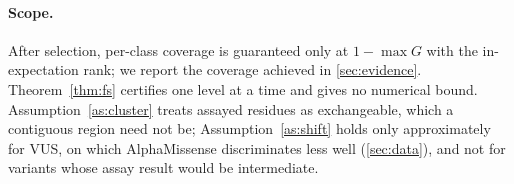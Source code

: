 \paragraph{Scope.}
After selection, per-class coverage is guaranteed only at $1-\max G$ with the in-expectation rank; we report the coverage
achieved in \cref{sec:evidence}. Theorem~\ref{thm:fs} certifies one level at a time and gives no numerical bound.
Assumption~\ref{as:cluster} treats assayed residues as exchangeable, which a contiguous region need not be;
Assumption~\ref{as:shift} holds only approximately for VUS, on which AlphaMissense discriminates less well
(\cref{sec:data}), and not for variants whose assay result would be intermediate.
